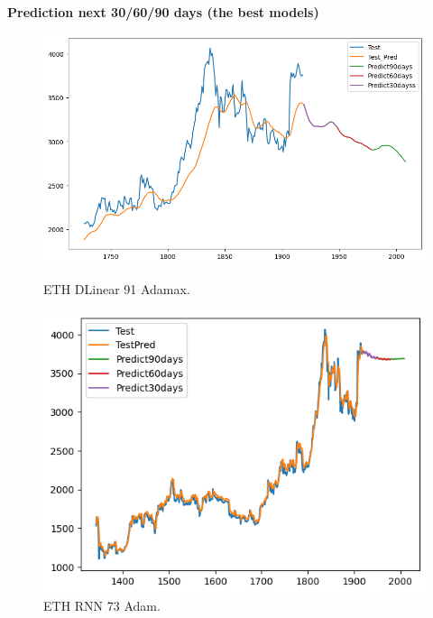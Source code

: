\documentclass{ieeeojies}
\begin{document}
\textbf{Prediction next 30/60/90 days (the best models)}
\begin{figure}[H]
  \centering
  \begin{minipage}{0.48\linewidth}
    \centering
    \includegraphics[width=1\linewidth]{image/ETH_DLinear_91_Adamax.png}
    \caption{ETH DLinear 91 Adamax.}
  \end{minipage}
\hfill
  \begin{minipage}{0.48\linewidth}
    \centering
    \includegraphics[width=1\linewidth]{image/ETH_RNN_73_Adam.png}
    \caption{ETH RNN 73 Adam.}
  \end{minipage}
\end{figure}
\end{document}
